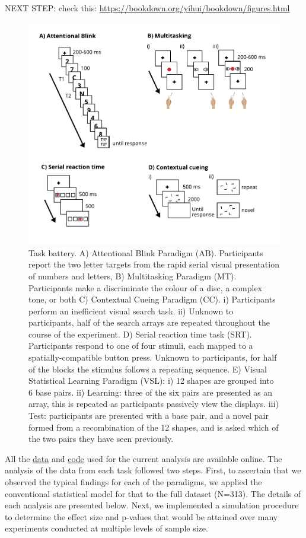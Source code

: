 \documentclass{article}
\begin{document}
NEXT STEP: check this:
\url{https://bookdown.org/yihui/bookdown/figures.html}

\begin{figure}

{\centering \includegraphics[width=0.7\linewidth]{../images/FigXXXX_alltasks} 

}

\caption{Task battery. A) Attentional Blink Paradigm (AB). Participants report the two letter targets from the rapid serial visual presentation of numbers and letters, B) Multitasking Paradigm (MT). Participants make a discriminate the colour of a disc, a complex tone, or both C) Contextual Cueing Paradigm (CC). i) Participants perform an inefficient visual search task. ii) Unknown to participants, half of the search arrays are repeated throughout the course of the experiment. D) Serial reaction time task (SRT). Participants respond to one of four stimuli, each mapped to a spatially-compatible button press. Unknown to participants, for half of the blocks the stimulus follows a repeating sequence. E) Visual Statistical Learning Paradigm (VSL): i) 12 shapes are grouped into 6 base pairs. ii) Learning: three of the six pairs are presented as an array, this is repeated as participants passively view the displays. iii) Test: participants are presented with a base pair, and a novel pair formed from a recombination of the 12 shapes, and is asked which of the two pairs they have seen previously.}\label{fig:fig:FigureParadigm}
\end{figure}

All the \href{}{data} and
\href{https://github.com/kel-github/Super-Effects}{code} used for the
current analysis are available online. The analysis of the data from
each task followed two steps. First, to ascertain that we observed the
typical findings for each of the paradigms, we applied the conventional
statistical model for that to the full dataset (N=313). The details of
each analysis are presented below. Next, we implemented a simulation
procedure to determine the effect size and p-values that would be
attained over many experiments conducted at multiple levels of sample
size.
\end{document}
